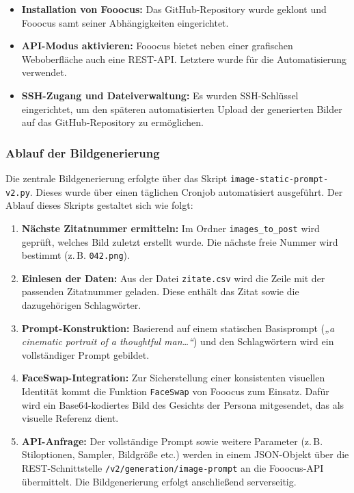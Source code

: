 \documentclass[a4paper,12pt]{article}
\begin{document}
\begin{itemize}
    \item \textbf{Installation von Fooocus:} Das GitHub-Repository wurde geklont und Fooocus samt seiner Abhängigkeiten eingerichtet.
    \item \textbf{API-Modus aktivieren:} Fooocus bietet neben einer grafischen Weboberfläche auch eine REST-API. Letztere wurde für die Automatisierung verwendet.
    \item \textbf{SSH-Zugang und Dateiverwaltung:} Es wurden SSH-Schlüssel eingerichtet, um den späteren automatisierten Upload der generierten Bilder auf das GitHub-Repository zu ermöglichen.
\end{itemize}

\subsubsection*{Ablauf der Bildgenerierung}

Die zentrale Bildgenerierung erfolgte über das Skript \texttt{image-static-prompt-v2.py}. Dieses wurde über einen täglichen Cronjob automatisiert ausgeführt. Der Ablauf dieses Skripts gestaltet sich wie folgt:

\begin{enumerate}
    \item \textbf{Nächste Zitatnummer ermitteln:} Im Ordner \texttt{images\_to\_post} wird geprüft, welches Bild zuletzt erstellt wurde. Die nächste freie Nummer wird bestimmt (z.\,B. \texttt{042.png}).
    
    \item \textbf{Einlesen der Daten:} Aus der Datei \texttt{zitate.csv} wird die Zeile mit der passenden Zitatnummer geladen. Diese enthält das Zitat sowie die dazugehörigen Schlagwörter.

    \item \textbf{Prompt-Konstruktion:} Basierend auf einem statischen Basisprompt (\textit{„a cinematic portrait of a thoughtful man…“}) und den Schlagwörtern wird ein vollständiger Prompt gebildet.

    \item \textbf{FaceSwap-Integration:} Zur Sicherstellung einer konsistenten visuellen Identität kommt die Funktion \texttt{FaceSwap} von Fooocus zum Einsatz. Dafür wird ein Base64-kodiertes Bild des Gesichts der Persona mitgesendet, das als visuelle Referenz dient.

    \item \textbf{API-Anfrage:} Der vollständige Prompt sowie weitere Parameter (z.\,B. Stiloptionen, Sampler, Bildgröße etc.) werden in einem JSON-Objekt über die REST-Schnittstelle \texttt{/v2/generation/image-prompt} an die Fooocus-API übermittelt. Die Bildgenerierung erfolgt anschließend serverseitig.
\end{enumerate}
\end{document}
